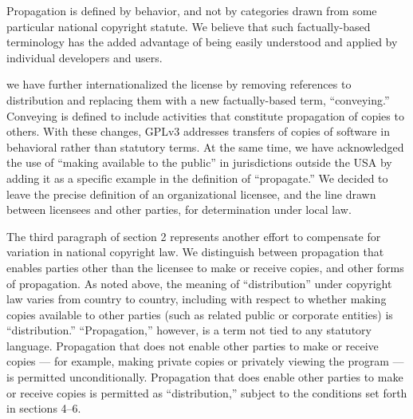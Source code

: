 
Propagation is defined by behavior, and not by categories drawn from some
particular national copyright statute.  We believe that such factually-based
terminology has the added advantage of being easily understood and applied by
individual developers and users.


we have further internationalized the license by removing references to
distribution and replacing them with a new factually-based term,
``conveying.'' Conveying is defined to include activities that constitute
propagation of copies to others.  With these changes, GPLv3 addresses
transfers of copies of software in behavioral rather than statutory terms.
At the same time, we have acknowledged the use of ``making available to the
public'' in jurisdictions outside the USA by adding it as a specific example
in the definition of ``propagate.'' We decided to leave the precise
definition of an organizational licensee, and the line drawn between
licensees and other parties, for determination under local law.


The third paragraph of section 2 represents another effort to compensate for
variation in national copyright law.  We distinguish between propagation that
enables parties other than the licensee to make or receive copies, and other
forms of propagation.  As noted above, the meaning of ``distribution'' under
copyright law varies from country to country, including with respect to
whether making copies available to other parties (such as related public or
corporate entities) is ``distribution.'' ``Propagation,'' however, is a term
not tied to any statutory language.  Propagation that does not enable other
parties to make or receive copies --- for example, making private copies or
privately viewing the program --- is permitted unconditionally.  Propagation
that does enable other parties to make or receive copies is permitted as
``distribution,'' subject to the conditions set forth in sections 4--6.


